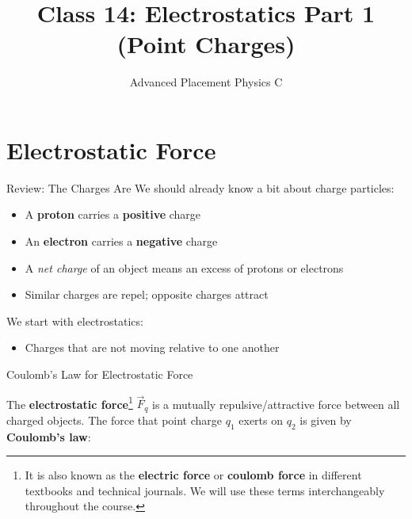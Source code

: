 \documentclass[12pt,aspectratio=169]{beamer}
\title{Class 14: Electrostatics Part 1 (Point Charges)}
\subtitle{Advanced Placement Physics C}
\begin{document}
\begin{frame}
  \maketitle
\end{frame}


\section{Electrostatic Force}

\begin{frame}{Review: The Charges Are}
  We should already know a bit about charge particles:
  \begin{itemize}
  \item A \textbf{proton} carries a \textbf{positive} charge
  \item An \textbf{electron} carries a \textbf{negative} charge
  \item A \emph{net charge} of an object means an excess of protons or electrons
  \item Similar charges are repel; opposite charges attract
  \end{itemize}

  \vspace{.2in}We start with electrostatics:
  \begin{itemize}
  \item Charges that are not moving relative to one another
  \end{itemize}
\end{frame}



\begin{frame}{Coulomb's Law for Electrostatic Force}
  \begin{center}
  \end{center}
  The \textbf{electrostatic force}\footnote{It is also known as the
  \textbf{electric force} or \textbf{coulomb force} in different textbooks and
  technical journals. We will use these terms interchangeably throughout the
  course.} $\vec F_q$ is a mutually repulsive/attractive force between all
  charged objects. The force that point charge $q_1$ exerts on $q_2$ is given
  by \textbf{Coulomb's law}:

  \vspace{.2in}
  
\end{frame}
\end{document}
